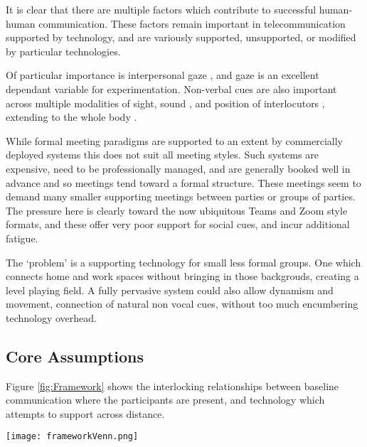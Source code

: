             It is clear that there are multiple factors which contribute to successful human-human communication. These factors remain important in telecommunication supported by technology, and are variously supported, unsupported, or modified by particular technologies.\par
            Of particular importance is interpersonal gaze \cite{Cook1977, Kleinke1986, Fagel2010}, and gaze is an excellent dependant variable for experimentation. Non-verbal cues are also important across multiple modalities of sight, sound \cite{Otsuka2005}, and position of interlocutors \cite{Kendon1967}, extending to the whole body \cite{Kleinke1986, Nguyen2009}.\par
            While formal meeting paradigms are supported to an extent by commercially deployed systems this does not suit all meeting styles. Such systems are expensive, need to be professionally managed, and are generally booked well in advance and so meetings tend toward a formal structure. These meetings seem to demand many smaller supporting meetings between parties or groups of parties. The pressure here is clearly toward the now ubiquitous Teams and Zoom style formats, and these offer very poor support for social cues, and incur additional fatigue.\par
The `problem' is a supporting technology for small less formal groups. One which connects home and work spaces without bringing in those backgrouds, creating a level playing field. A fully pervasive system could also allow dynamism and movement, connection of natural non vocal cues, without too much encumbering technology overhead.
            
            \subsection{Core Assumptions}
                Figure \ref{fig:Framework} shows the interlocking relationships between baseline communication where the participants are present, and technology which attempts to support across distance.
                \begin{figure*}[h]
                \centering
                \texttt{[image: frameworkVenn.png]}
                \caption{The Venn diagram shows areas of research which have been identified in blue. These interlock and overlap as shown. The most relevant identified researchers from the literature are shown in black close to the fields of study which they represent. This diagram is a view of the core assumptions for the research, with the most important fields at the centre. }
                \label{fig:Framework}
                \end{figure*}
                

